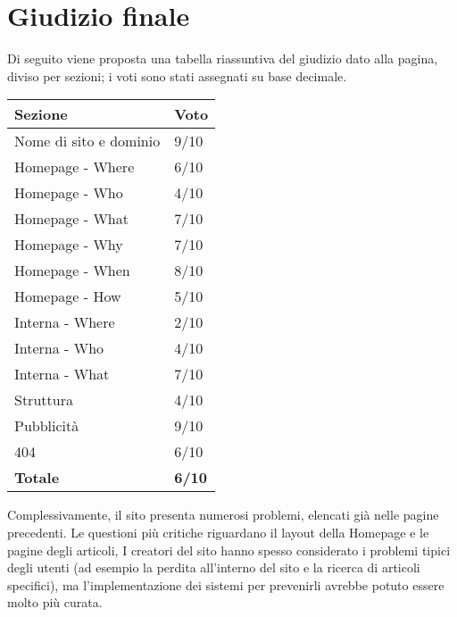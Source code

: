 \newpage
\section{Giudizio finale}

Di seguito viene proposta una tabella riassuntiva del giudizio dato alla pagina, diviso per sezioni; i voti sono stati assegnati su base decimale.

\vspace{30pt}
\begin{table}[htbp]
\centering
\begin{tabular}{|l|l|}
\hline
Sezione                & Voto \\ \hline
Nome di sito e dominio & 9/10    \\
Homepage - Where       & 6/10    \\
Homepage - Who         & 4/10    \\
Homepage - What        & 7/10    \\
Homepage - Why         & 7/10    \\
Homepage - When        & 8/10    \\
Homepage - How         & 5/10    \\
Interna - Where        & 2/10    \\
Interna - Who          & 4/10    \\
Interna - What         & 7/10    \\
Struttura              & 4/10    \\
Pubblicità             & 9/10    \\
404                    & 6/10    \\ \hline
\textbf{Totale}        & \textbf{6/10}    \\ \hline
\end{tabular}
\end{table}
\vspace{30pt}

Complessivamente, il sito presenta numerosi problemi, elencati già nelle pagine precedenti. Le questioni più critiche riguardano il layout della Homepage e le pagine degli articoli, I creatori del sito hanno spesso considerato i problemi tipici degli utenti (ad esempio la perdita all'interno del sito e la ricerca di articoli specifici), ma l'implementazione dei sistemi per prevenirli avrebbe potuto essere molto più curata. \\